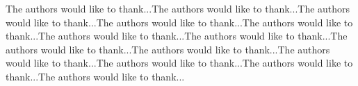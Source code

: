 \documentclass[10pt,journal,cspaper,compsoc]{IEEEtran}
\begin{document}
The authors would like to thank...The authors would like to thank...The authors would like to thank...The authors would like to thank...The authors would like to thank...The authors would like to thank...The authors would like to thank...The authors would like to thank...The authors would like to thank...The authors would like to thank...The authors would like to thank...The authors would like to thank...The authors would like to thank...


\ifCLASSOPTIONcaptionsoff
  \newpage
\fi








%
%
%




\end{document}
